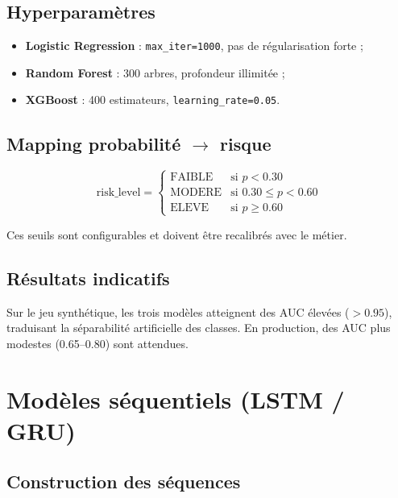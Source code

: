 \subsection{Hyperparamètres}

\begin{itemize}[leftmargin=*]
  \item \textbf{Logistic Regression} : \texttt{max\_iter=1000}, pas de régularisation forte ;
  \item \textbf{Random Forest} : 300 arbres, profondeur illimitée ;
  \item \textbf{XGBoost} : 400 estimateurs, \texttt{learning\_rate=0.05}.
\end{itemize}

\subsection{Mapping probabilité $\rightarrow$ risque}

\begin{equation}
\text{risk\_level} =
\begin{cases}
\text{FAIBLE} & \text{si } p < 0.30 \\
\text{MODERE} & \text{si } 0.30 \leq p < 0.60 \\
\text{ELEVE} & \text{si } p \geq 0.60
\end{cases}
\end{equation}

Ces seuils sont configurables et doivent être recalibrés avec le métier.

\subsection{Résultats indicatifs}

Sur le jeu synthétique, les trois modèles atteignent des AUC élevées ($> 0.95$), traduisant la séparabilité artificielle des classes. En production, des AUC plus modestes (0.65--0.80) sont attendues.


\section{Modèles séquentiels (LSTM / GRU)}

\subsection{Construction des séquences}

